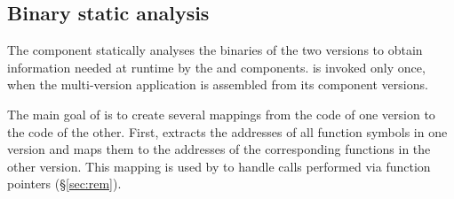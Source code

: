 
\subsection{Binary static analysis}
\label{sec:sea}


The \sea component statically analyses the binaries of the two
versions to obtain information needed at runtime by the \mxm and \rem
components.  \sea is invoked only once, when the multi-version
application is assembled from its component versions.

The main goal of \sea is to create several mappings from the code of
one version to the code of the other.  First, \sea extracts the
addresses of all function symbols
in one version and maps them to the
addresses of the corresponding functions in the other version.  This
mapping is used by \rem to handle calls performed via function
pointers (\S\ref{sec:rem}).

